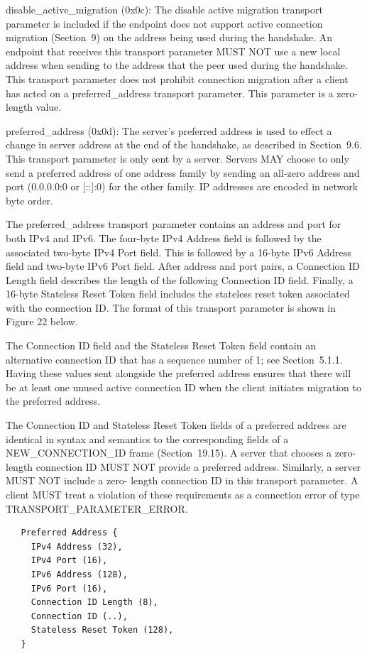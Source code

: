 \documentclass{article}
\begin{document}
disable\_active\_migration (0x0c):  The disable active migration transport parameter is included if the endpoint does not support active connection migration (Section~9) on the address being used during the handshake.  An endpoint that receives this transport parameter MUST NOT use a new local address when sending to the address that the peer used during the handshake.  This transport parameter does not prohibit connection migration after a client has acted on a preferred\_address transport parameter.  This parameter is a zero-length value.

preferred\_address (0x0d):  The server's preferred address is used to effect a change in server address at the end of the handshake, as described in Section~9.6.  This transport parameter is only sent by a server.  Servers MAY choose to only send a preferred address of one address family by sending an all-zero address and port (0.0.0.0:0 or [::]:0) for the other family.  IP addresses are encoded in network byte order.

The preferred\_address transport parameter contains an address and port for both IPv4 and IPv6.  The four-byte IPv4 Address field is followed by the associated two-byte IPv4 Port field.  This is followed by a 16-byte IPv6 Address field and two-byte IPv6 Port field.  After address and port pairs, a Connection ID Length field describes the length of the following Connection ID field. Finally, a 16-byte Stateless Reset Token field includes the stateless reset token associated with the connection ID.  The format of this transport parameter is shown in Figure 22 below.

The Connection ID field and the Stateless Reset Token field contain an alternative connection ID that has a sequence number of 1; see Section~5.1.1.  Having these values sent alongside the preferred address ensures that there will be at least one unused active connection ID when the client initiates migration to the preferred address.

The Connection ID and Stateless Reset Token fields of a preferred address are identical in syntax and semantics to the corresponding fields of a NEW\_CONNECTION\_ID frame (Section~19.15).  A server that chooses a zero-length connection ID MUST NOT provide a preferred address.  Similarly, a server MUST NOT include a zero- length connection ID in this transport parameter.  A client MUST treat a violation of these requirements as a connection error of type TRANSPORT\_PARAMETER\_ERROR.

\begin{verbatim}
   Preferred Address {
     IPv4 Address (32),
     IPv4 Port (16),
     IPv6 Address (128),
     IPv6 Port (16),
     Connection ID Length (8),
     Connection ID (..),
     Stateless Reset Token (128),
   }
\end{verbatim}
\end{document}

